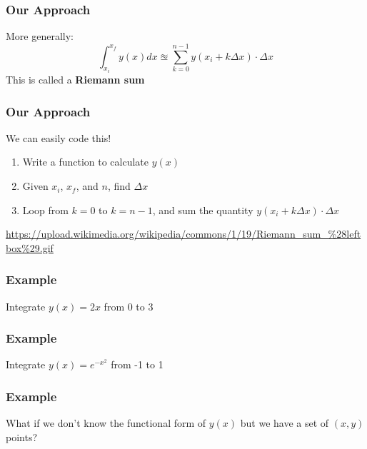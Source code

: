 \documentclass{beamer}
\begin{document}
	\begin{frame}
	\frametitle{Our Approach}
	More generally:
	\begin{equation*}
		\int_{x_i}^{x_f}y(x)dx\approxeq \sum_{k=0}^{n-1}y(x_i+k\Delta x)\cdot\Delta x
	\end{equation*}
	This is called a \textbf{Riemann sum}
	\end{frame}

	\begin{frame}
	\frametitle{Our Approach}
	We can easily code this!
	\begin{enumerate}
		\item Write a function to calculate $y(x)$
		\item Given $x_i$, $x_f$, and $n$, find $\Delta x$
		\item Loop from $k=0$ to $k=n-1$, and sum the quantity $y(x_i+k\Delta x)\cdot \Delta x$
	\end{enumerate}
	\end{frame}

	\begin{frame}
		\href{https://upload.wikimedia.org/wikipedia/commons/1/19/Riemann_sum_\%28leftbox\%29.gif}{https://upload.wikimedia.org/wikipedia/commons/1/19/Riemann\_sum\_\%28leftbox\%29.gif}
	\end{frame}

	\begin{frame}
	\frametitle{Example}
	Integrate $y(x)=2x$ from 0 to 3
	\end{frame}


	\begin{frame}
	\frametitle{Example}
	Integrate $y(x)=e^{-x^2}$ from -1 to 1
	\end{frame}

	\begin{frame}
	\frametitle{Example}
	What if we don't know the functional form of $y(x)$ but we have a set of $(x,y)$ points?
	\end{frame}
\end{document}
